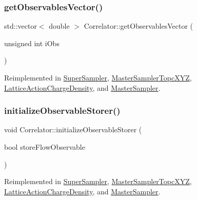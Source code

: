 \mbox{\label{class_correlator_a7fb062b098beb078f3e546f4717b4941}} 
\subsubsection{\texorpdfstring{getObservablesVector()}{getObservablesVector()}}
{\footnotesize\ttfamily std\+::vector$<$ double $>$ Correlator\+::get\+Observables\+Vector (\begin{DoxyParamCaption}\item[{unsigned int}]{i\+Obs }\end{DoxyParamCaption})\hspace{0.3cm}{\ttfamily [virtual]}}



Reimplemented in \mbox{\hyperlink{class_super_sampler_a2b81588289576169c2148a88ddad482f}{Super\+Sampler}}, \mbox{\hyperlink{class_master_sampler_topc_x_y_z_a1a922db23320ff46f8f736788c6977bb}{Master\+Sampler\+Topc\+X\+YZ}}, \mbox{\hyperlink{class_lattice_action_charge_density_a72952fbe5ade96d53196d6c2c93896e5}{Lattice\+Action\+Charge\+Density}}, and \mbox{\hyperlink{class_master_sampler_a471dffa3f29c68b4152b195708a9a5ac}{Master\+Sampler}}.

\mbox{\label{class_correlator_ab99886c09dd27dfc8676d0032cecf9bc}} 
\subsubsection{\texorpdfstring{initializeObservableStorer()}{initializeObservableStorer()}}
{\footnotesize\ttfamily void Correlator\+::initialize\+Observable\+Storer (\begin{DoxyParamCaption}\item[{bool}]{store\+Flow\+Observable }\end{DoxyParamCaption})\hspace{0.3cm}{\ttfamily [virtual]}}



Reimplemented in \mbox{\hyperlink{class_super_sampler_a4429d6ae37247a02259bc0c6d665821c}{Super\+Sampler}}, \mbox{\hyperlink{class_master_sampler_topc_x_y_z_af6d2cf2023d9626908fd26b07a7a0b84}{Master\+Sampler\+Topc\+X\+YZ}}, \mbox{\hyperlink{class_lattice_action_charge_density_aba3131bbe5bd930adccc2852b4d44bb9}{Lattice\+Action\+Charge\+Density}}, and \mbox{\hyperlink{class_master_sampler_a88e2eec68ea6bd60cc3f375ac04a8ded}{Master\+Sampler}}.

